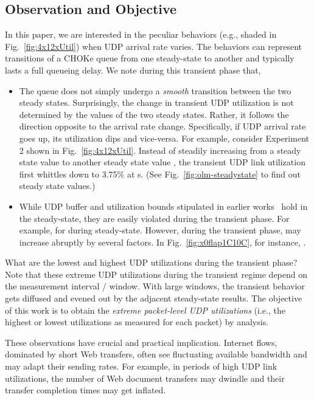 \documentclass{IEEEtran}
\begin{document}
\subsection{Observation and Objective}\label{subsub:exObservation}
    In this paper, we are interested in the peculiar behaviors  (e.g., shaded in Fig.~\ref{fig:4x12xUtil}) when UDP arrival rate varies. The behaviors can represent transitions of a CHOKe queue from one steady-state to another and typically lasts a full queueing delay. We note during this transient phase that,
    \begin{itemize}
        \item The queue does not simply undergo a \emph{smooth} transition between the two steady states.  Surprisingly, the change in transient UDP utilization is not determined by the  values of the two steady states. Rather, it follows the direction opposite to the arrival rate change. Specifically, if UDP arrival rate goes up, its utilization dips and vice-versa. For example, consider Experiment 2 shown in Fig.~\ref{fig:4x12xUtil}. Instead of steadily increasing  from a steady state value   to another steady state value , the transient UDP link utilization first whittles down to 3.75\% at s. (See Fig.~\ref{fig:olm-steadystate} to find out steady state  values.)
        \item While UDP buffer and utilization bounds stipulated in earlier works~\cite{ChokeToN04,ChokeSigmetrics03} hold in the steady-state, they are easily violated during the transient phase. For example,  for  during steady-state. However, during the transient phase,  may increase abruptly by several factors. In Fig.~\ref{fig:x0flap1C10C}, for instance, .
    \end{itemize}
    What are the lowest and highest UDP utilizations during the transient phase? Note that these extreme UDP utilizations during the transient regime depend on the measurement interval / window. With large windows, the transient behavior gets diffused and evened out by the adjacent steady-state results. The objective of this work is to obtain the \emph{extreme packet-level UDP utilizations} (i.e., the highest or lowest utilizations as measured for each packet) by analysis.

These observations have crucial and practical implication. Internet flows, dominated by short Web transfers, often see fluctuating available bandwidth and may adapt their sending rates.  For example, in periods of high UDP link utilizations, the number of Web document transfers may dwindle and their transfer completion times may get inflated.
\end{document}
